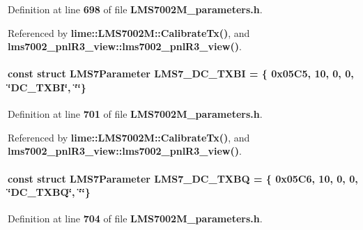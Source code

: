 Definition at line {\bf 698} of file {\bf L\+M\+S7002\+M\+\_\+parameters.\+h}.



Referenced by {\bf lime\+::\+L\+M\+S7002\+M\+::\+Calibrate\+Tx()}, and {\bf lms7002\+\_\+pnl\+R3\+\_\+view\+::lms7002\+\_\+pnl\+R3\+\_\+view()}.

\paragraph[{L\+M\+S7\+\_\+\+D\+C\+\_\+\+T\+X\+BI}]{\setlength{\rightskip}{0pt plus 5cm}const struct {\bf L\+M\+S7\+Parameter} L\+M\+S7\+\_\+\+D\+C\+\_\+\+T\+X\+BI = \{ 0x05\+C5, 10, 0, 0, \char`\"{}\+D\+C\+\_\+\+T\+X\+B\+I\char`\"{}, \char`\"{}\char`\"{}\}\hspace{0.3cm}{\ttfamily [static]}}\label{LMS7002M__parameters_8h_a136eea6e03b468b1540e67f7bdea1f8b}


Definition at line {\bf 701} of file {\bf L\+M\+S7002\+M\+\_\+parameters.\+h}.



Referenced by {\bf lime\+::\+L\+M\+S7002\+M\+::\+Calibrate\+Tx()}, and {\bf lms7002\+\_\+pnl\+R3\+\_\+view\+::lms7002\+\_\+pnl\+R3\+\_\+view()}.

\paragraph[{L\+M\+S7\+\_\+\+D\+C\+\_\+\+T\+X\+BQ}]{\setlength{\rightskip}{0pt plus 5cm}const struct {\bf L\+M\+S7\+Parameter} L\+M\+S7\+\_\+\+D\+C\+\_\+\+T\+X\+BQ = \{ 0x05\+C6, 10, 0, 0, \char`\"{}\+D\+C\+\_\+\+T\+X\+B\+Q\char`\"{}, \char`\"{}\char`\"{}\}\hspace{0.3cm}{\ttfamily [static]}}\label{LMS7002M__parameters_8h_a16d34378d05e15850b6697267ea3fbab}


Definition at line {\bf 704} of file {\bf L\+M\+S7002\+M\+\_\+parameters.\+h}.



